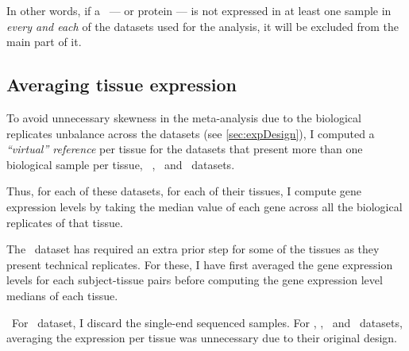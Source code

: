 In other words, if a \mRNA\ --- or protein --- is not expressed in at least
one sample in \emph{every and each} of the datasets used for the analysis,
it will be excluded from the main part of it.

\subsection{Averaging tissue expression}
To avoid unnecessary skewness in the meta-analysis due to
the biological replicates unbalance across the datasets
(see \cref{sec:expDesign}), I computed a \emph{\enquote{virtual} reference} per
tissue for the datasets that present more than one biological sample per tissue,
\ie\ \vt, \uhlen\ and \gtex\ datasets.

Thus, for each of these datasets, for each of their tissues, I compute gene
expression levels by taking the median value of each gene across all the
biological replicates of that tissue.

The \uhlen\ dataset has required an extra prior step for some of the tissues
as they present technical replicates.
For these, I have first averaged the gene expression levels
for each subject-tissue pairs before computing the gene expression level medians
of each tissue.

\NB\ For \ibm\ dataset, I discard the single-end sequenced samples.
For \castle, \cutler, \kuster\ and \pandey\ datasets, averaging the expression
per tissue was unnecessary due to their original design.



